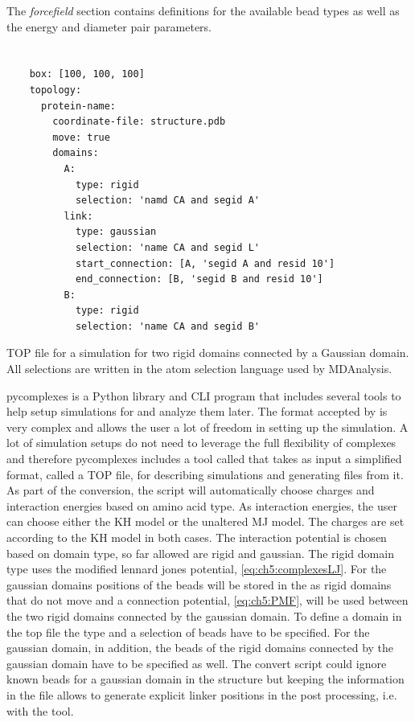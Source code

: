 \documentclass[12pt, twoside]{report}
\begin{document}
The \textit{forcefield} section contains definitions for the available bead
types as well as the energy and diameter pair parameters.

\chapter{\pycomplexes}
\begin{listing}[!ht]
  \begin{verbatim}
    box: [100, 100, 100]
    topology:
      protein-name:
        coordinate-file: structure.pdb
        move: true
        domains:
          A:
            type: rigid
            selection: 'namd CA and segid A'
          link:
            type: gaussian
            selection: 'name CA and segid L'
            start_connection: [A, 'segid A and resid 10']
            end_connection: [B, 'segid B and resid 10']
          B:
            type: rigid
            selection: 'name CA and segid B'
\end{verbatim}
\caption{TOP file for a simulation for two rigid domains connected by a Gaussian
domain. All selections are written in the atom selection language used by
MDAnalysis.}
\label{listing:top-definitions}
\end{listing} pycomplexes is a \mbox{Python} library and \gls{CLI} program that
includes several tools to help setup simulations for \complexes and analyze them
later. The \cplx format accepted by \complexes is very complex and allows the
user a lot of freedom in setting up the simulation. A lot of simulation setups
do not need to leverage the full flexibility of complexes and therefore
pycomplexes includes a tool called  that takes as input a
simplified format, called a TOP file, for describing simulations and generating
\cplx files from it. As part of the conversion, the script will automatically
choose charges and interaction energies based on amino acid type. As interaction
energies, the user can choose either the \gls{KH} model or the unaltered
\gls{MJ} model. The charges are set according to the \gls{KH} model in both
cases. The interaction potential is chosen based on domain type, so far allowed
are rigid and gaussian. The rigid domain type uses the modified lennard jones
potential, \cref{eq:ch5:complexesLJ}. For the gaussian domains positions of the
\calpha beads will be stored in the \cplx as rigid domains that do not move and
a connection potential, \cref{eq:ch5:PMF}, will be used between the two rigid
domains connected by the gaussian domain. To define a domain in the top file the
type and a selection of beads have to be specified. For the gaussian domain, in
addition, the beads of the rigid domains connected by the gaussian domain have
to be specified as well. The convert script could ignore known beads for a
gaussian domain in the structure but keeping the information in the \cplx file
allows to generate explicit linker positions in the post processing, i.e. with
the  tool.
\end{document}
